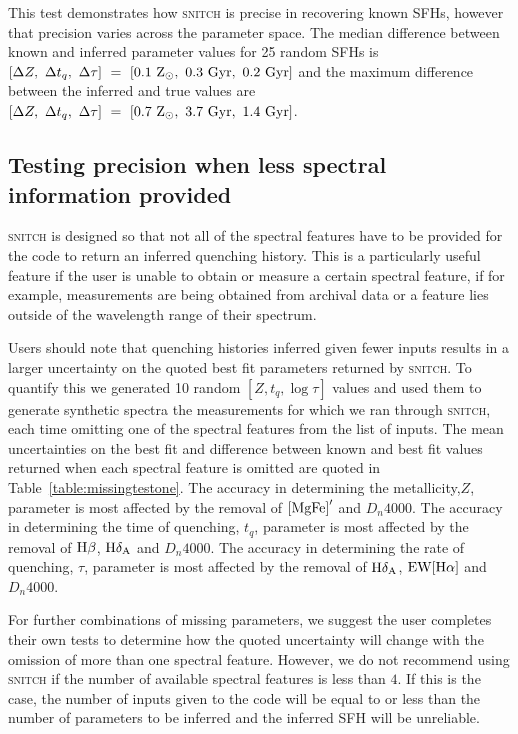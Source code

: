 \documentclass[useAMS,usenatbib]{mn2e}
\begin{document}
This test demonstrates how \textsc{snitch} is precise in recovering known SFHs, however that precision varies across the parameter space. The median difference between known and inferred parameter values for 25 random SFHs is $[\Delta Z,~\Delta t_q,~\Delta \tau]~=~[0.1~\rm{Z}_{\odot},~0.3~\rm{Gyr},~0.2~\rm{Gyr}]$ and the maximum difference between the inferred and true values are $[\Delta Z,~\Delta t_q,~\Delta \tau]~=~[0.7~\rm{Z}_{\odot},~3.7~\rm{Gyr},~1.4~\rm{Gyr}]$.


\subsection{Testing precision when less spectral information provided}\label{sec:missingtest}



\textsc{snitch} is designed so that not all of the spectral features have to be provided for the code to return an inferred quenching history. This is a particularly useful feature if the user is unable to obtain or measure a certain spectral feature, if for example, measurements are being obtained from archival data or a feature lies outside of the wavelength range of their spectrum. 

Users should note that quenching histories inferred given fewer inputs results in a larger uncertainty on the quoted best fit parameters returned by \textsc{snitch}. To quantify this we generated 10 random $[Z, t_q, \log \tau]$ values and used them to generate synthetic spectra the measurements for which we ran through \textsc{snitch}, each time omitting one of the spectral features from the list of inputs. The mean uncertainties on the best fit and difference between known and best fit values returned when each spectral feature is omitted are quoted in Table~\ref{table:missingtestone}. The accuracy in determining the metallicity,$Z$, parameter is most affected by the removal of $\rm{[MgFe]}^{\prime}$ and $D_n4000$. The accuracy in determining the time of quenching, $t_q$, parameter is most affected by the removal of $\rm{H}\beta$, $\rm{H}\delta_A$ and $D_n4000$. The accuracy in determining the rate of quenching, $\tau$, parameter is most affected by the removal of $\rm{H}\delta_A$, $\rm{EW[H}\alpha]$ and $D_n4000$.

For further combinations of missing parameters, we suggest the user completes their own tests to determine how the quoted uncertainty will change with the omission of more than one spectral feature. However, we do not recommend using \textsc{snitch} if the number of available spectral features is less than $4$. If this is the case, the number of inputs given to the code will be equal to or less than the number of parameters to be inferred and the inferred SFH will be unreliable. 
\end{document}

